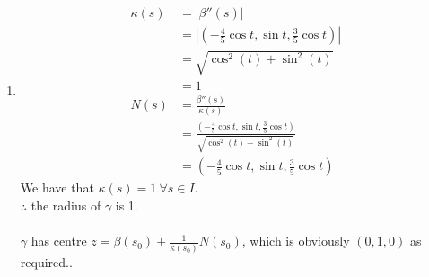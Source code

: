 \documentclass{article}
\newcommand{\abs}[1]{\left|#1\right|}
\theoremstyle{definition}
\theoremstyle{remark}
\theoremstyle{example}
\begin{document}
\begin{enumerate}
		\pagebreak
		
		\item \begin{align*}
			\kappa(s) &= \abs{\beta''(s)}\\
			&=\abs{\left( -\frac{4}{5}\cos t, \sin t, \frac{3}{5} \cos t \right)}\\
			&= \sqrt{\cos^2(t) + \sin^2(t)}\\
			&= 1\\
			N(s) &= \frac{\beta''(s)}{\kappa(s)}\\
			&= \frac{\left( -\frac{4}{5}\cos t, \sin t, \frac{3}{5} \cos t \right)}{\sqrt{\cos^2(t) + \sin^2(t)}}\\
			&= \left( -\frac{4}{5}\cos t, \sin t, \frac{3}{5} \cos t \right)
		\end{align*}
		We have that $\kappa(s)=1 \ \forall s \in I$.\\
		$\therefore$ the radius of $\gamma$ is 1.\\
		\\
		$\gamma$ has centre $z=\beta(s_0)+\frac{1}{\kappa(s_0)}N(s_0)$, which is obviously $(0,1,0)$ as required..
	\end{enumerate}
	
\end{document}
